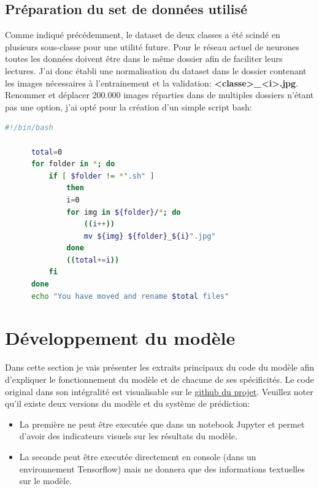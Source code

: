 \documentclass[a4paper,12pt]{report}
\begin{document}
      \subsection{Préparation du set de données utilisé}
      Comme indiqué précédemment, le dataset de deux classes a été scindé en plusieurs sous-classe pour une utilité future. Pour le réseau actuel de neurones toutes les données doivent être dans le même dossier afin de faciliter leurs lectures.
      \medbreak
      J'ai donc établi une normalisation du dataset dans le dossier contenant les images nécessaires à l'entrainement et la validation: \textbf{<classe>\_<i>.jpg}. Renommer et déplacer 200.000 images réparties dans de multiples dossiers n'étant pas une option, j'ai opté pour la création d'un simple script bash:
      \begin{lstlisting}[language=Bash, title=mvIterator.sh]
      #!/bin/bash

      total=0
      for folder in *; do
          if [ $folder != *".sh" ]
              then
              i=0
              for img in ${folder}/*; do
                  ((i++))
                  mv ${img} ${folder}_${i}".jpg"    
              done
              ((total+=i))
          fi
      done
      echo "You have moved and rename $total files"
      \end{lstlisting}

    \section{Développement du modèle}
    Dans cette section je vais présenter les extraits principaux du code du modèle afin d'expliquer le fonctionnement du modèle et de chacune de ses spécificités. Le code original dans son intégralité est visualisable sur le \href{https://github.com/plabadille/cookedDishRecognizer/blob/master/cookedDishModel.py}{github du projet}. Veuillez noter qu'il existe deux versions du modèle et du système de prédiction: 
    \begin{itemize}
      \item La première ne peut être executée que dans un notebook Jupyter et permet d'avoir des indicateurs visuels sur les résultats du modèle.
      \item La seconde peut être executée directement en console (dans un environnement Tensorflow) mais ne donnera que des informations textuelles sur le modèle.
    \end{itemize}
\end{document}
